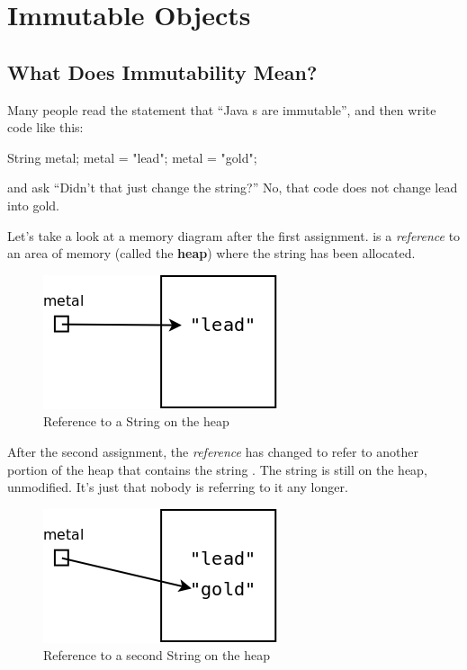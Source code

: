 \chapter{Immutable Objects}

\section{What Does Immutability Mean?}

Many people read the statement that ``Java s are immutable'', and then write code like this:

\begin{code}
String metal;
metal = "lead";
metal = "gold";
\end{code}

and ask ``Didn't that just change the string?''  No, that code does not change lead into gold.

Let's take a look at a memory diagram after the first assignment.  is a {\em reference} to an area of memory (called the {\bf heap}) where the string  has been allocated.

\begin{figure}[!h]
\begin{center}
\includegraphics[scale=0.4]{figs/heap1.png}
\caption{Reference to a String on the heap}
\label{fig.heap1}
\end{center}
\end{figure}

After the second assignment, the {\em reference} has changed to refer to another portion of the heap that contains the string . The string  is still on the heap, unmodified. It's just that nobody is referring to it any longer.

\begin{figure}[!h]
\begin{center}
\includegraphics[scale=0.4]{figs/heap2.png}
\caption{Reference to a second String on the heap}
\label{fig.heap2}
\end{center}
\end{figure}

